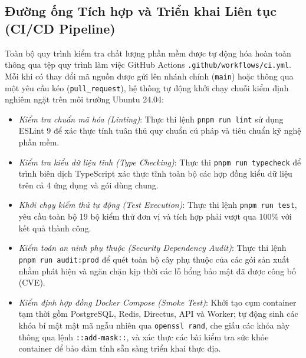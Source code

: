 \subsection{Đường ống Tích hợp và Triển khai Liên tục (CI/CD Pipeline)}
Toàn bộ quy trình kiểm tra chất lượng phần mềm được tự động hóa hoàn toàn thông qua tệp quy trình làm việc GitHub Actions \texttt{.github/workflows/ci.yml}. Mỗi khi có thay đổi mã nguồn được gửi lên nhánh chính (\texttt{main}) hoặc thông qua một yêu cầu kéo (\texttt{pull\_request}), hệ thống tự động khởi chạy chuỗi kiểm định nghiêm ngặt trên môi trường Ubuntu 24.04:
\begin{itemize}
    \item[-] \textit{Kiểm tra chuẩn mã hóa (Linting)}: Thực thi lệnh \texttt{pnpm run lint} sử dụng ESLint 9 để xác thực tính tuân thủ quy chuẩn cú pháp và tiêu chuẩn kỹ nghệ phần mềm.
    \item[-] \textit{Kiểm tra kiểu dữ liệu tĩnh (Type Checking)}: Thực thi \texttt{pnpm run typecheck} để trình biên dịch TypeScript xác thực tĩnh toàn bộ các hợp đồng kiểu dữ liệu trên cả 4 ứng dụng và gói dùng chung.
    \item[-] \textit{Khởi chạy kiểm thử tự động (Test Execution)}: Thực thi lệnh \texttt{pnpm run test}, yêu cầu toàn bộ 19 bộ kiểm thử đơn vị và tích hợp phải vượt qua 100\% với kết quả thành công.
    \item[-] \textit{Kiểm toán an ninh phụ thuộc (Security Dependency Audit)}: Thực thi lệnh \texttt{pnpm run audit:prod} để quét toàn bộ cây phụ thuộc của các gói sản xuất nhằm phát hiện và ngăn chặn kịp thời các lỗ hổng bảo mật đã được công bố (CVE).
    \item[-] \textit{Kiểm định hợp đồng Docker Compose (Smoke Test)}: Khởi tạo cụm container tạm thời gồm PostgreSQL, Redis, Directus, API và Worker; tự động sinh các khóa bí mật mật mã ngẫu nhiên qua \texttt{openssl rand}, che giấu các khóa này thông qua lệnh \texttt{::add-mask::}, và xác thực các bài kiểm tra sức khỏe container để bảo đảm tính sẵn sàng triển khai thực địa.
\end{itemize}

